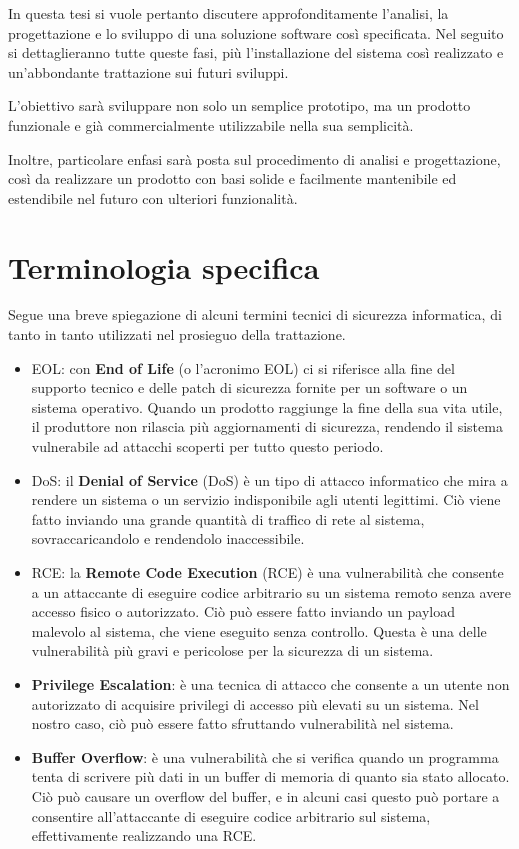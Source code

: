 In questa tesi si vuole pertanto discutere approfonditamente l'analisi, la progettazione e lo sviluppo di una soluzione software così specificata.
Nel seguito si dettaglieranno tutte queste fasi, più l'installazione del sistema così realizzato e un'abbondante trattazione sui futuri sviluppi.

L'obiettivo sarà sviluppare non solo un semplice prototipo, ma un prodotto funzionale e già commercialmente utilizzabile nella sua semplicità.

Inoltre, particolare enfasi sarà posta sul procedimento di analisi e progettazione, così da realizzare un prodotto con basi solide e facilmente mantenibile ed estendibile nel futuro con ulteriori funzionalità.

\section{Terminologia specifica}
Segue una breve spiegazione di alcuni termini tecnici di sicurezza informatica, di tanto in tanto utilizzati nel prosieguo della trattazione.

\begin{itemize}
    \item EOL: con \textbf{End of Life} (o l'acronimo EOL) ci si riferisce alla fine del supporto tecnico e delle patch di sicurezza fornite per un software o un sistema operativo. Quando un prodotto raggiunge la fine della sua vita utile, il produttore non rilascia più aggiornamenti di sicurezza, rendendo il sistema vulnerabile ad attacchi scoperti per tutto questo periodo.
    \item DoS: il \textbf{Denial of Service} (DoS) è un tipo di attacco informatico che mira a rendere un sistema o un servizio indisponibile agli utenti legittimi. Ciò viene fatto inviando una grande quantità di traffico di rete al sistema, sovraccaricandolo e rendendolo inaccessibile.
    \item RCE: la \textbf{Remote Code Execution} (RCE) è una vulnerabilità che consente a un attaccante di eseguire codice arbitrario su un sistema remoto senza avere accesso fisico o autorizzato. Ciò può essere fatto inviando un payload malevolo al sistema, che viene eseguito senza controllo. Questa è una delle vulnerabilità più gravi e pericolose per la sicurezza di un sistema.
    \item \textbf{Privilege Escalation}: è una tecnica di attacco che consente a un utente non autorizzato di acquisire privilegi di accesso più elevati su un sistema. Nel nostro caso, ciò può essere fatto sfruttando vulnerabilità nel sistema.
    \item \textbf{Buffer Overflow}: è una vulnerabilità che si verifica quando un programma tenta di scrivere più dati in un buffer di memoria di quanto sia stato allocato. Ciò può causare un overflow del buffer, e in alcuni casi questo può portare a consentire all'attaccante di eseguire codice arbitrario sul sistema, effettivamente realizzando una RCE.
\end{itemize}